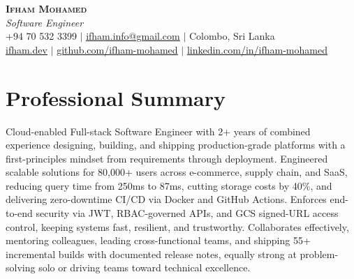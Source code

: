 \documentclass[letterpaper,11pt]{article}
\begin{document}
\begin{center}
    \textbf{\Huge \scshape Ifham Mohamed} \\ \vspace{2pt}
    \small \textit{Software Engineer} \\ \vspace{2pt}
    \small +94 70 532 3399 $|$
    \href{mailto:ifham.info@gmail.com}{\underline{ifham.info@gmail.com}} $|$
    Colombo, Sri Lanka \\ \vspace{2pt}
    \href{https://ifham.dev}{\underline{ifham.dev}} $|$
    \href{https://github.com/ifham-mohamed}{\underline{github.com/ifham-mohamed}} $|$
    \href{https://linkedin.com/in/ifham-mohamed}{\underline{linkedin.com/in/ifham-mohamed}}
\end{center}

\section{Professional Summary}
\small{Cloud-enabled Full-stack Software Engineer with 2+ years of combined experience designing, building, and shipping production-grade platforms with a first-principles mindset from requirements through deployment. Engineered scalable solutions for 80,000+ users across e-commerce, supply chain, and SaaS, reducing query time from 250ms to 87ms, cutting storage costs by 40\%, and delivering zero-downtime CI/CD via Docker and GitHub Actions. Enforces end-to-end security via JWT, RBAC-governed APIs, and GCS signed-URL access control, keeping systems fast, resilient, and trustworthy. Collaborates effectively, mentoring colleagues, leading cross-functional teams, and shipping 55+ incremental builds with documented release notes, equally strong at problem-solving solo or driving teams toward technical excellence.
}

\end{document}
